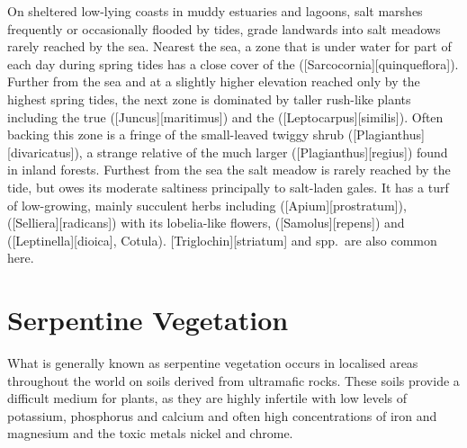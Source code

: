 On sheltered low-lying coasts in muddy estuaries and lagoons, salt marshes frequently or occasionally flooded by tides, grade landwards into salt meadows rarely reached by the sea.
Nearest the sea, a zone that is under water for part of each day during spring tides has a close cover of the  ([Sarcocornia][quinqueflora]).
Further from the sea and at a slightly higher elevation reached only by the highest spring tides, the next zone is dominated by taller rush-like plants including the true  ([Juncus][maritimus]) and the  ([Leptocarpus][similis]).
Often backing this zone is a fringe of the small-leaved twiggy shrub  ([Plagianthus][divaricatus]), a strange relative of the much larger  ([Plagianthus][regius]) found in inland forests.
Furthest from the sea the salt meadow is rarely reached by the tide, but owes its moderate saltiness principally to salt-laden gales.
It has a turf of low-growing, mainly succulent herbs including  ([Apium][prostratum]),  ([Selliera][radicans]) with its lobelia-like flowers,  ([Samolus][repens]) and  ([Leptinella][dioica], Cotula). [Triglochin][striatum] and  spp.\ are also common here.

\section{Serpentine Vegetation}

What is generally known as serpentine vegetation occurs in localised areas throughout the world on soils derived from ultramafic rocks.
These soils provide a difficult medium for plants, as they are highly infertile with low levels of potassium, phosphorus and calcium and often high concentrations of iron and magnesium and the toxic metals nickel and chrome.

